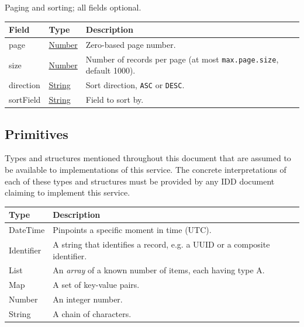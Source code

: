 \documentclass[a4paper]{arrowhead}
\newcommand{\pdef}[1]{{\textcolor{ArrowheadGrey}{#1\label{sec:model:primitives:#1}\label{sec:model:primitives:#1s}\label{sec:model:primitives:#1es}}}}
\newcommand{\pref}[1]{{\textcolor{ArrowheadGrey}{\hyperref[sec:model:primitives:#1]{#1}}}}
\begin{document}

Paging and sorting; all fields optional.


\noindent\begin{tabularx}{\textwidth}{| >{\raggedright\arraybackslash}p{3.9cm} | >{\raggedright\arraybackslash\small}p{5.3cm} | X |} \hline
\rowcolor{gray!33} Field & Type & Description \\ \hline
page & \pref{Number} & Zero-based page number. \\ \hline
size & \pref{Number} & Number of records per page (at most \texttt{max.\allowbreak{}page.\allowbreak{}size}, default 1000). \\ \hline
direction & \pref{String} & Sort direction, \texttt{ASC} or \texttt{DESC}. \\ \hline
sort\allowbreak{}Field & \pref{String} & Field to sort by. \\ \hline
\end{tabularx}



\subsection{Primitives}
\label{sec:model:primitives}

Types and structures mentioned throughout this document that are assumed to be available to implementations of this service.
The concrete interpretations of each of these types and structures must be provided by any IDD document claiming to implement this service.

\noindent\begin{tabularx}{\textwidth}{| p{4.6cm} | X |} \hline
\rowcolor{gray!33} Type & Description \\ \hline
\pdef{DateTime} & Pinpoints a specific moment in time (UTC). \\ \hline
\pdef{Identifier} & A string that identifies a record, e.g. a UUID or a composite identifier. \\ \hline
\pdef{List} & An \textit{array} of a known number of items, each having type A. \\ \hline
\pdef{Map} & A set of key-value pairs. \\ \hline
\pdef{Number} & An integer number. \\ \hline
\pdef{String} & A chain of characters. \\ \hline
\end{tabularx}

\newpage
\end{document}
